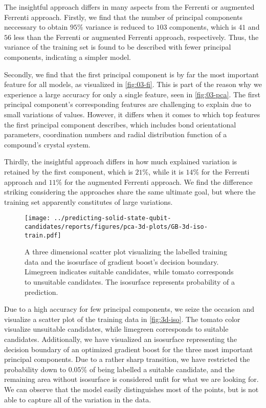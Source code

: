 The insightful approach differs in many aspects from the Ferrenti or augmented Ferrenti approach. Firstly, we find that the number of principal components neccessary to obtain $95\%$ variance is reduced to $103$ components, which is $41$ and $56$ less than the Ferrenti or augmented Ferrenti approach, respectively. Thus, the variance of the training set is found to be described with fewer principal components, indicating a simpler model.

Secondly, we find that the first principal component is by far the most important feature for all models, as visualized in \autoref{fig:03-fi}. This is part of the reason why we experience a large accuracy for only a single feature, seen in \autoref{fig:03-pca}. The first principal component's corresponding features are challenging to explain due to small variations of values. However, it differs when it comes to which top features the first principal component describes, which includes bond orientational parameters, coordination numbers and radial distribution function of a compound's crystal system.

Thirdly, the insightful approach differs in how much explained variation is retained by the first component, which is $21\%$, while it is $14\%$ for the Ferrenti approach and $11\%$ for the augmented Ferrenti approach. We find the difference striking considering the approaches share the same ultimate goal, but where the training set apparently constitutes of large variations.

\begin{figure}[h!]
    \centering
    \texttt{[image: ../predicting-solid-state-qubit-candidates/reports/figures/pca-3d-plots/GB-3d-iso-train.pdf]}
  \vspace*{-140mm}
  \caption{A three dimensional scatter plot visualizing the labelled training data and the isosurface of gradient boost's decision boundary. Limegreen indicates suitable candidates, while tomato corresponds to unsuitable candidates. The isosurface represents probability of a prediction.}
  \label{fig:3d-iso}
\end{figure}

Due to a high accuracy for few principal components, we seize the occasion and visualize a scatter plot of the training data in \autoref{fig:3d-iso}. The tomato color visualize unsuitable candidates, while limegreen corresponds to suitable candidates. Additionally, we have visualized an isosurface representing the decision boundary of an optimized gradient boost for the three most important principal components. Due to a rather sharp transition, we have restricted the probability down to $0.05\%$ of being labelled a suitable candidate, and the remaining area without isosurface is considered unfit for what we are looking for. We can observe that the model easily distinguishes most of the points, but is not able to capture all of the variation in the data.


